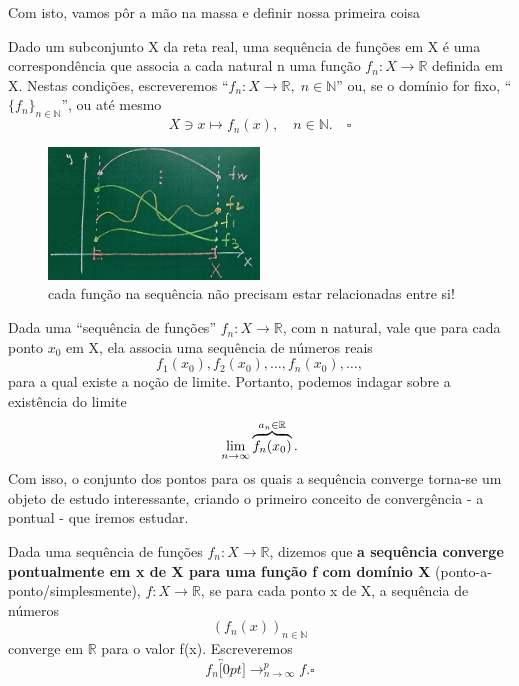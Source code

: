\documentclass[../analysisII_notes.tex]{subfiles}
\begin{document}
Com isto, vamos pôr a mão na massa e definir nossa primeira coisa
\begin{def*}
	Dado um subconjunto X da reta real, uma sequência de funções em X é uma correspondência que associa a cada natural n uma função \(f_{n}:X\rightarrow \mathbb{R}\) definida em X. Nestas condições, escreveremos ``\(f_{n}:X\rightarrow \mathbb{R},\; n\in \mathbb{N}\)'' ou, se o domínio for fixo, ``\(\{f_{n}\}_{n\in \mathbb{N}}\)'', ou até mesmo
	\[
		X\ni x \mapsto f_{n}(x),\quad n\in \mathbb{N}.\quad \square
	\]
\end{def*}
\begin{figure}[H]
	\begin{center}
		\includegraphics[height=0.5\textheight, width=0.5\textwidth, keepaspectratio]{./Images/sequence_functions_15.png}
	\end{center}
	\caption{cada função na sequência não precisam estar relacionadas entre si!}
	\label{seq15}
\end{figure}
\begin{tcolorbox}[
		skin=enhanced,
		title=Observação,
		fonttitle=\bfseries,
		colframe=black,
		colbacktitle=cyan!75!white,
		colback=cyan!15,
		colbacklower=black,
		coltitle=black,
		drop fuzzy shadow,
	]
	Dada uma ``sequência de funções'' \(f_{n}:X\rightarrow \mathbb{R}\), com n natural, vale que para cada ponto \(x_{0}\) em X, ela associa uma sequência de números reais
	\[
		f_1(x_{0}), f_2(x_{0}), \dotsc , f_{n}(x_{0}), \dotsc,
	\]
	para a qual existe a noção de limite. Portanto, podemos indagar sobre a existência do limite
	\[
		\lim_{n\to \infty}\overbrace{f_{n}(x_{0})}^{\mathclap{a_{n}\in \mathbb{R}}}.
	\]
	Com isso, o conjunto dos pontos para os quais a sequência converge torna-se um objeto de estudo interessante, criando o primeiro conceito de convergência - a pontual - que iremos estudar.
\end{tcolorbox}
\begin{def*}
	Dada uma sequência de funções \(f_{n}:X\rightarrow \mathbb{R}\), dizemos que \textbf{a sequência converge pontualmente em x de X para uma função f com domínio X} (ponto-a-ponto/simplesmente), \(f:X\rightarrow \mathbb{R}\), se para cada ponto x de X, a sequência de números
	\[
		(f_{n}(x))_{n\in \mathbb{N}}
	\]
	converge em \(\mathbb{R}\) para o valor f(x). Escreveremos
	\[
		f_{n}\overbracket[0pt]{\longrightarrow}_{n\to \infty}^{p}f. \square
	\]
\end{def*}
\end{document}
